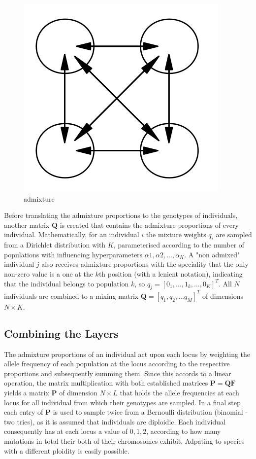 \documentclass[a4paper, 11pt]{article}
\begin{document}
\begin{figure}
\centering
\includegraphics[scale=0.5]{level_2}
\caption{admixture}
\end{figure}


Before translating the admixture proportions to the genotypes of individuals, another matrix  $\mathbf{Q}$ is created that contains the admixture proportions of every individual. Mathematically, for an individual $i$ the mixture weights $q_i$ are sampled from a Dirichlet distribution with $K$, parameterised according to the number of populations with influencing hyperparameters $\alpha1, \alpha2, \ldots,  \alpha_K$. A "non admixed" individual $j$ also receives admixture proportions with the speciality that the only non-zero value is a one at the $k$th position (with a lenient notation), indicating that the individual belongs to population $k$, so $q_j = [0_1, \ldots, 1_k, \ldots, 0_K]^T$. All $N$ individuals are combined to a mixing matrix $\mathbf{Q} = [q_1,q_2, \ldots q_M]^T$ of dimensions $N \times K$. \\

\subsection{Combining the Layers}

The admixture proportions of an individual act upon each locus by weighting the allele frequency of each population at the locus according to the respective proportions and subsequently summing them. Since this accords to a linear operation, the matrix multiplication with both established matrices $\mathbf{P} = \mathbf{Q}\mathbf{F}$ yields a matrix $\mathbf{P}$ of dimension $N \times L$ that holds the allele frequencies at each locus for all individual from which their genotypes are sampled. In a final step each entry of $\mathbf{P}$ is used to sample twice from a Bernoulli distribution (binomial - two tries), as it is assumed that individuals are diploidic. Each individual consequently has at each locus a value of $0, 1, 2$, according to how many mutations in total their both of their chromosomes exhibit. Adpating to species with a different ploidity is easily possible.\\
\end{document}
